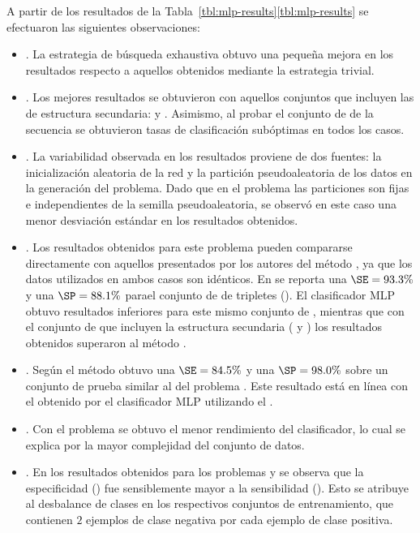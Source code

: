 %

A partir de los resultados de la
\iflatexml{}Tabla~\ref{tbl:mlp-results}\else\autoref{tbl:mlp-results}\fi{}
se efectuaron las siguientes observaciones:
%
\begin{itemize}
\item
  .
  La estrategia de búsqueda exhaustiva obtuvo una pequeña mejora en
  los resultados respecto a aquellos obtenidos mediante la estrategia
  trivial.
\item
  .
  Los mejores resultados se obtuvieron con aquellos conjuntos que
  incluyen las  de estructura secundaria:  y
  .
  Asimismo, al probar el conjunto de  de la secuencia se
  obtuvieron tasas de clasificación subóptimas en todos los casos.
\item
  .
  La variabilidad observada en los resultados proviene de dos fuentes:
  la inicialización aleatoria de la red y la partición pseudoaleatoria
  de los datos en la generación del problema.
  Dado que en el problema \prob\tripletsvm{} las particiones son fijas
  e independientes de la semilla pseudoaleatoria, se observó en este
  caso una menor desviación estándar en los resultados obtenidos.
\item
  .
  Los resultados obtenidos para este problema pueden compararse
  directamente con aquellos presentados por los autores del método
  \work\tripletsvm{} \cite{xue}, ya que los datos utilizados en ambos
  casos son idénticos.
  En \cite{xue} se reporta una $\SE=93.3\%$ y una $\SP=88.1\%$ parael
  conjunto de  de tripletes ().
  El clasificador MLP obtuvo resultados inferiores para este mismo
  conjunto de , mientras que con el conjunto de 
  que incluyen la estructura secundaria ( y )
  los resultados obtenidos superaron al método \work\tripletsvm{}.
\item
  .
  Según \cite{ng} el método \work{\mipred} obtuvo una $\SE=84.5\%$ y
  una $\SP=98.0\%$ sobre un conjunto de prueba similar al del problema
  \prob\mipred{}.
  Este resultado está en línea con el obtenido por el clasificador MLP
  utilizando el  .
\item
  .
  Con el problema \prob\micropred{} se obtuvo el menor rendimiento del
  clasificador, lo cual se explica por la mayor complejidad del
  conjunto de datos.
\item
  .
  En los resultados obtenidos para los problemas \prob\mipred{} y
  \prob\micropred{} se observa que la especificidad (\SP) fue
  sensiblemente mayor a la sensibilidad (\SE).
  Esto se atribuye al desbalance de clases en los respectivos
  conjuntos de entrenamiento, que contienen $2$ ejemplos de clase
  negativa por cada ejemplo de clase positiva.
\end{itemize}
%
